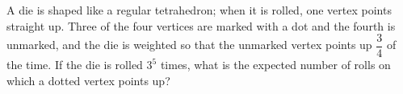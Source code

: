 A die is shaped like a regular tetrahedron; when it is rolled, one vertex points straight up. Three of the four vertices are marked with a dot and the fourth is unmarked, and the die is weighted so that the unmarked vertex points up $\dfrac{3}{4}$ of the time. If the die is rolled $3^5$ times, what is the expected number of rolls on which a dotted vertex points up?
